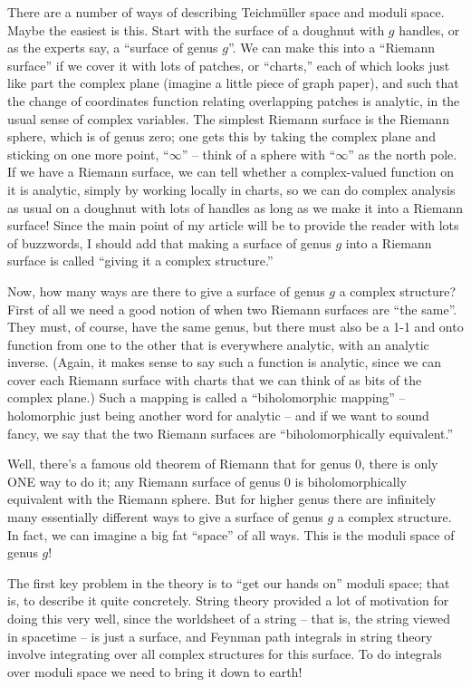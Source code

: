 \documentclass[12pt]{article}
\begin{document}
There are a number of ways of describing Teichm\"uller space and moduli
space. Maybe the easiest is this. Start with the surface of a doughnut
with \(g\) handles, or as the experts say, a ``surface of genus \(g\)''.
We can make this into a ``Riemann surface'' if we cover it with lots of
patches, or ``charts,'' each of which looks just like part the complex
plane (imagine a little piece of graph paper), and such that the change
of coordinates function relating overlapping patches is analytic, in the
usual sense of complex variables. The simplest Riemann surface is the
Riemann sphere, which is of genus zero; one gets this by taking the
complex plane and sticking on one more point, ``\(\infty\)'' -- think of
a sphere with ``\(\infty\)'' as the north pole. If we have a Riemann
surface, we can tell whether a complex-valued function on it is
analytic, simply by working locally in charts, so we can do complex
analysis as usual on a doughnut with lots of handles as long as we make
it into a Riemann surface! Since the main point of my article will be to
provide the reader with lots of buzzwords, I should add that making a
surface of genus \(g\) into a Riemann surface is called ``giving it a
complex structure.''

Now, how many ways are there to give a surface of genus \(g\) a complex
structure? First of all we need a good notion of when two Riemann
surfaces are ``the same''. They must, of course, have the same genus,
but there must also be a 1-1 and onto function from one to the other
that is everywhere analytic, with an analytic inverse. (Again, it makes
sense to say such a function is analytic, since we can cover each
Riemann surface with charts that we can think of as bits of the complex
plane.) Such a mapping is called a ``biholomorphic mapping'' --
holomorphic just being another word for analytic -- and if we want to
sound fancy, we say that the two Riemann surfaces are
``biholomorphically equivalent.''

Well, there's a famous old theorem of Riemann that for genus 0, there is
only ONE way to do it; any Riemann surface of genus 0 is
biholomorphically equivalent with the Riemann sphere. But for higher
genus there are infinitely many essentially different ways to give a
surface of genus \(g\) a complex structure. In fact, we can imagine a
big fat ``space'' of all ways. This is the moduli space of genus \(g\)!

The first key problem in the theory is to ``get our hands on'' moduli
space; that is, to describe it quite concretely. String theory provided
a lot of motivation for doing this very well, since the worldsheet of a
string -- that is, the string viewed in spacetime -- is just a surface,
and Feynman path integrals in string theory involve integrating over all
complex structures for this surface. To do integrals over moduli space
we need to bring it down to earth!
\end{document}

